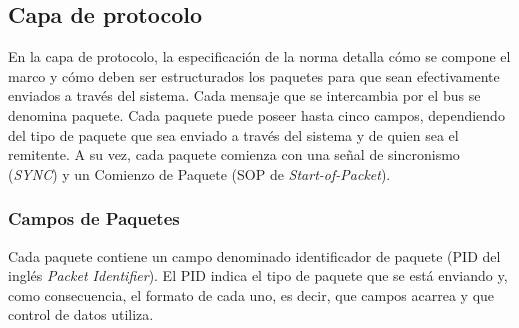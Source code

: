 \subsection{Capa de protocolo}
	En la capa de protocolo, la especificación de la norma detalla cómo se compone el marco y cómo deben ser estructurados los paquetes para que sean efectivamente enviados a través del sistema. Cada mensaje que se intercambia por el bus se denomina paquete. Cada paquete puede poseer hasta cinco campos, dependiendo del tipo de paquete que sea enviado a través del sistema y de quien sea el remitente. A su vez, cada paquete comienza con una señal de sincronismo ({\it SYNC}) y un Comienzo de Paquete (SOP de {\it Start-of-Packet}).\\
	
	\subsubsection*{Campos de Paquetes}
	Cada paquete contiene un campo denominado identificador de paquete (PID del inglés {\it Packet Identifier}). El PID indica el tipo de paquete que se está enviando y, como consecuencia, el formato de cada uno, es decir, que campos acarrea y que control de datos utiliza.
	
